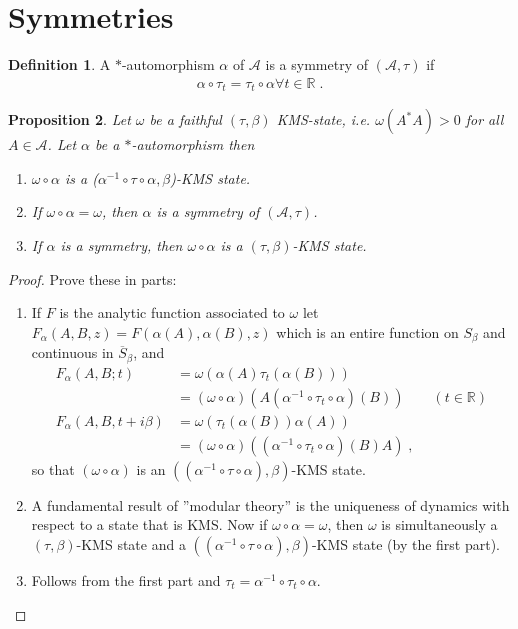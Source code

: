 \documentclass[
a4paper, %
11pt, %
onecolumn, %
openany, %
]{memoir}
\theoremstyle{definition}
\newtheorem{definition}{Definition}[chapter]
\theoremstyle{remark}
\theoremstyle{plain}
\newtheorem{prop}[definition]{Proposition}
\begin{document}
\section{Symmetries}
\begin{definition}
A $*$-automorphism $\alpha$ of $\mathcal{A}$ is a symmetry of $(\mathcal{A},\tau)$ if \begin{align}
\alpha\circ\tau_t=\tau_t\circ \alpha \forall t \in \mathbb{R}\; .
\end{align}
\end{definition}
\begin{prop}
Let $\omega$ be a faithful $(\tau,\beta)$ KMS-state, i.e. $\omega(A^*A)>0$ for all $A\in\mathcal{A}$. Let $\alpha$ be a $*$-automorphism then \begin{enumerate}
\item $\omega\circ\alpha$ is a ($\alpha^{-1}\circ\tau\circ\alpha,\beta$)-KMS state.
\item If $\omega\circ \alpha = \omega$, then $\alpha$ is a symmetry of $(\mathcal{A},\tau)$.
\item If $\alpha$ is a symmetry, then $\omega\circ\alpha$ is a $(\tau,\beta)$-KMS state.
\end{enumerate}
\end{prop}
\begin{proof}
Prove these in parts: 
\begin{enumerate}
\item If $F$ is the analytic function associated to $\omega$ let $F_{\alpha}(A,B,z)=F(\alpha(A),\alpha(B),z)$ which is an entire function on $S_{\beta}$ and continuous in $\overline{S}_{\beta}$, and \begin{align}
F_{\alpha}(A,B; t)&=\omega(\alpha(A)\tau_t(\alpha(B)))\\
&=(\omega\circ \alpha)(A(\alpha^{-1}\circ\tau_t\circ\alpha)(B))\qquad (t\in\mathbb{R})\\
F_{\alpha}(A,B,t+i\beta)&=\omega(\tau_t(\alpha(B))\alpha(A))\\
&=(\omega\circ\alpha)((\alpha^{-1}\circ\tau_t\circ\alpha)(B)A)\; ,
\end{align}
so that $(\omega\circ\alpha)$ is an $((\alpha^{-1}\circ\tau\circ\alpha),\beta)$-KMS state.
\item A fundamental result of ''modular theory'' is the uniqueness of dynamics with respect to a state that is KMS. Now if $\omega\circ\alpha=\omega$, then $\omega$ is simultaneously a $(\tau,\beta)$-KMS state and a $((\alpha^{-1}\circ\tau\circ\alpha),\beta)$-KMS state (by the first part).
\item Follows from the first part and $\tau_t=\alpha^{-1}\circ\tau_t\circ\alpha$.
\end{enumerate}
\end{proof}
\end{document}
